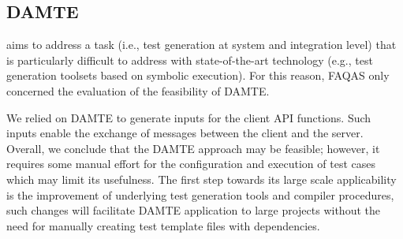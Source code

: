 \subsection{DAMTE}

\DAMTE aims to address a task (i.e., test generation at system and integration level) that is particularly difficult to address with state-of-the-art technology (e.g., test generation toolsets based on symbolic execution). 
For this reason, FAQAS only concerned the evaluation of the feasibility of DAMTE.

We relied on DAMTE to generate inputs for the \PARAM client API functions. Such inputs enable the exchange of messages between the \PARAM client and the \PARAM server. Overall, we conclude that the DAMTE approach may be feasible; however, it requires some manual effort for the configuration and execution of test cases which may limit its usefulness. The first step towards its large scale applicability is the improvement of underlying test generation tools and compiler procedures, such changes will facilitate DAMTE application to large projects without the need for manually creating test template files with dependencies.

%
%

